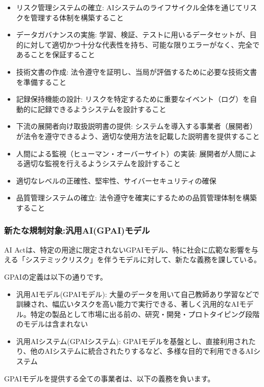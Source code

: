 \begin{itemize}
    \item リスク管理システムの確立: AIシステムのライフサイクル全体を通じてリスクを管理する体制を構築すること
    \item データガバナンスの実施: 学習、検証、テストに用いるデータセットが、目的に対して適切かつ十分な代表性を持ち、可能な限りエラーがなく、完全であることを保証すること
    \item 技術文書の作成: 法令遵守を証明し、当局が評価するために必要な技術文書を準備すること
    \item 記録保持機能の設計: リスクを特定するために重要なイベント（ログ）を自動的に記録できるようシステムを設計すること
    \item 下流の展開者向け取扱説明書の提供: システムを導入する事業者（展開者）が法令を遵守できるよう、適切な使用方法を記載した説明書を提供すること
    \item 人間による監視（ヒューマン・オーバーサイト）の実装: 展開者が人間による適切な監視を行えるようシステムを設計すること
    \item 適切なレベルの正確性、堅牢性、サイバーセキュリティの確保
    \item 品質管理システムの確立: 法令遵守を確実にするための品質管理体制を構築すること
\end{itemize}

\subsubsection{新たな規制対象:汎用AI(GPAI)モデル}
AI Actは、特定の用途に限定されないGPAIモデル、特に社会に広範な影響を与える「システミックリスク」を伴うモデルに対して、新たな義務を課している。

GPAIの定義は以下の通りです。

\begin{itemize}
    \item 汎用AIモデル(GPAIモデル): 大量のデータを用いて自己教師あり学習などで訓練され、幅広いタスクを高い能力で実行できる、著しく汎用的なAIモデル。特定の製品として市場に出る前の、研究・開発・プロトタイピング段階のモデルは含まれない
    \item 汎用AIシステム(GPAIシステム): GPAIモデルを基盤とし、直接利用されたり、他のAIシステムに統合されたりするなど、多様な目的で利用できるAIシステム
\end{itemize}

GPAIモデルを提供する全ての事業者は、以下の義務を負います。


